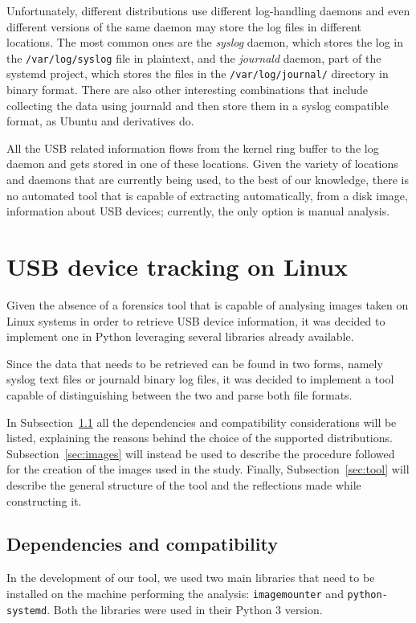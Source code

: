 \documentclass[a4paper]{article}
\begin{document}
Unfortunately, different distributions use different log-handling daemons and
even different versions of the same daemon may store the log files in
different locations. The most common ones are the \emph{syslog} daemon, which
stores the log in the \texttt{/var/log/syslog} file in plaintext, and the
\emph{journald} daemon, part of the systemd project, which stores the files in
the \texttt{/var/log/journal/} directory in binary format. There are also other
interesting combinations that include collecting the data using journald and
then store them in a syslog compatible format, as Ubuntu and derivatives
do.~\cite{poettering2012journal}

All the USB related information flows from the kernel ring buffer to the log
daemon and gets stored in one of these locations. Given the variety of locations
and daemons that are currently being used, to the best of our knowledge, there
is no automated tool that is capable of extracting automatically, from a disk
image, information about USB devices; currently, the only option is manual
analysis.

\section{USB device tracking on Linux}
\label{sec:contrib}
Given the absence of a forensics tool that is capable of analysing images taken
on Linux systems in order to retrieve USB device information, it was decided to
implement one in Python leveraging several libraries already available.

Since the data that needs to be retrieved can be found in two forms, namely
syslog text files or journald binary log files, it was decided to implement a
tool capable of distinguishing between the two and parse both file formats.

In Subsection~\ref{sec:prems} all the dependencies and compatibility
considerations will be listed, explaining the reasons behind the choice of the
supported distributions. Subsection~\ref{sec:images} will instead be used to
describe the procedure followed for the creation of the images used in the
study. Finally, Subsection~\ref{sec:tool} will describe the general structure of
the tool and the reflections made while constructing it.

\subsection{Dependencies and compatibility}
\label{sec:prems}
In the development of our tool, we used two main libraries that need
to be installed on the machine performing the analysis:
\texttt{imagemounter} and \texttt{python-systemd}. Both the libraries were used
in their Python 3 version.
\end{document}
